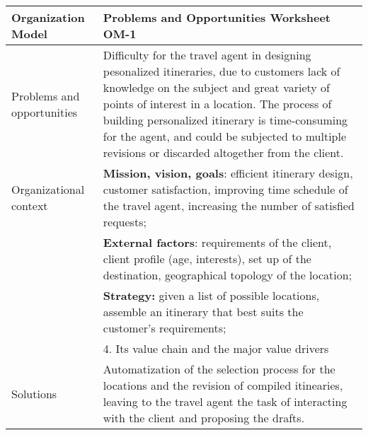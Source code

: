 \begin{tabular}%
       {|p{3cm}%
        |p{9.5cm}|}
\hline
{\bf Organization Model} &
   {\bf Problems and Opportunities Worksheet OM-1} \\
\hline
\hline
\sc Problems and opportunities &
   {\rm
   Difficulty for the travel agent in designing pesonalized itineraries, due to customers lack of knowledge on the subject and great variety of points of interest in a location. The process of building personalized itinerary is time-consuming for the agent, and could be subjected to multiple revisions or discarded altogether from the client.
   } \\
\hline
\sc Organizational context &
  {\rm \textbf{Mission, vision, goals}: efficient itinerary design, customer satisfaction, improving time schedule of the travel agent, increasing the number of satisfied requests;} \\
 & {\rm \textbf{External factors}: requirements of the client, client profile (age, interests), set up of the destination, geographical topology of the location;} \\
 & {\rm \textbf{Strategy:} given a list of possible locations, assemble an itinerary that best suits the customer's requirements;} \\
 & {\rm 4. Its value chain and the major value drivers}\\ %
\hline
\sc Solutions &
   {\rm Automatization of the selection process for the locations and the revision of compiled itinearies, leaving to the travel agent the task of interacting with the client and proposing the drafts.
   } \\
\hline
\end{tabular}
